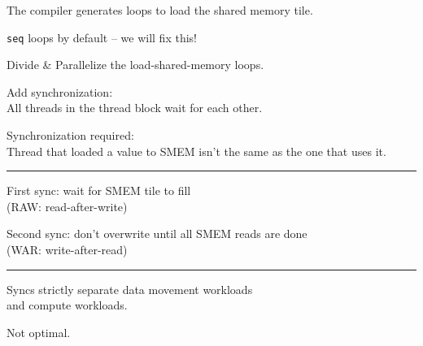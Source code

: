 {\LARGE
The compiler generates loops to load the shared memory tile.

\texttt{seq} loops by default -- we will fix this!

}

\newpage
{}

{\large

}

{\LARGE
Divide \& Parallelize the load-shared-memory loops.
}

\newpage
{}

{\large

}

{\LARGE
Add synchronization:\\
All threads in the thread block wait for each other.
}

\newpage
{}

{\LARGE
Synchronization required:\\
Thread that loaded a value to SMEM isn't the same as the one that uses it.

}

\vfill
\hrule
\vfill

\begin{center}
\Large
\begin{tikzpicture}[node distance=0mm]

\end{tikzpicture}
\end{center}

\newpage
{}

{\LARGE
First sync: wait for SMEM tile to fill\\(RAW: read-after-write)

Second sync: don't overwrite until all SMEM reads are done\\(WAR: write-after-read)

}

\vfill
\hrule
\vfill

\begin{center}
\Large
\begin{tikzpicture}[node distance=0mm]

\end{tikzpicture}
\end{center}

\newpage
{}

{\LARGE
Syncs strictly separate data movement workloads\\and compute workloads.

Not optimal.

}

